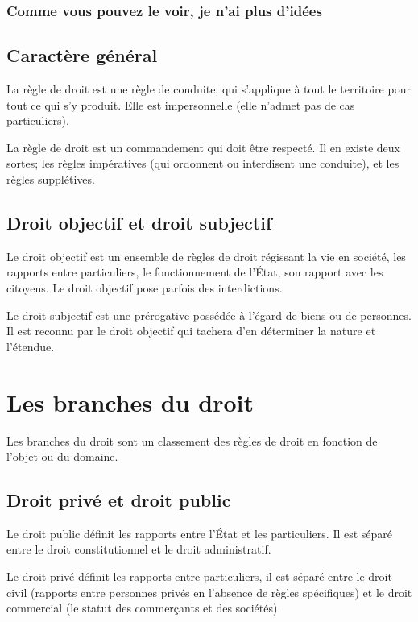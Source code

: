 \documentclass[10pt,a4paper,french]{article}
\begin{document}
\subsubsection{Comme vous pouvez le voir, je n'ai plus d'idées}

\subsection{Caractère général}

La règle de droit est une règle de conduite, qui s'applique à tout le territoire pour tout ce qui s'y produit. Elle est impersonnelle (elle n'admet pas de cas particuliers).

La règle de droit est un commandement qui doit être respecté. Il en existe deux sortes; les règles impératives (qui ordonnent ou interdisent une conduite), et les règles supplétives.

\subsection{Droit objectif et droit subjectif}

Le droit objectif est un ensemble de règles de droit régissant la vie en société, les rapports entre particuliers, le fonctionnement de l'État, son rapport avec les citoyens. Le droit objectif pose parfois des interdictions.

Le droit subjectif est une prérogative possédée à l'égard de biens ou de personnes. Il est reconnu par le droit objectif qui tachera d'en déterminer la nature et l'étendue.

\section{Les branches du droit}

Les branches du droit sont un classement des règles de droit en fonction de l'objet ou du domaine.

\subsection{Droit privé et droit public}

Le droit public définit les rapports entre l'État et les particuliers. Il est séparé entre le droit constitutionnel et le droit administratif.

Le droit privé définit les rapports entre particuliers, il est séparé entre le droit civil (rapports entre personnes privés en l'absence de règles spécifiques) et le droit commercial (le statut des commerçants et des sociétés).
\end{document}
